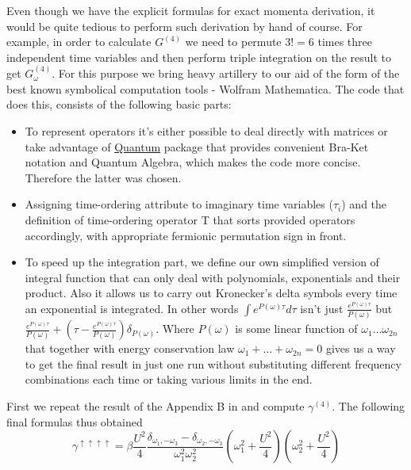 Even though we have the explicit formulas for exact momenta derivation, it would be quite tedious to perform such derivation by hand of course.
For example, in order to calculate $G^{(4)}$ we need to permute $3!=6$ times three independent time variables and then perform
 triple integration on the result to get $G_\omega^{(4)}$.
For this purpose we bring heavy artillery to our aid of the form of the best known symbolical computation tools - Wolfram Mathematica.
The code that does this, consists of the following basic parts:
\begin{itemize}
 \item To represent operators it's either possible to deal directly with matrices or take advantage of \href{http://homepage.cem.itesm.mx/lgomez/quantum/}{Quantum}
package that provides convenient Bra-Ket notation and Quantum Algebra, which makes the code more concise. Therefore the latter was chosen.
 \item Assigning time-ordering attribute to imaginary time variables ($\tau_i$) and the definition of time-ordering operator T that sorts provided operators accordingly,
with appropriate fermionic permutation sign in front.
 \item To speed up the integration part, we define our own simplified version of integral function that can only deal with polynomials, exponentials and their product.
Also it allows us to carry out Kronecker's delta symbols every time an exponential is integrated.
In other words $\int e^{P(\omega)\tau}d\tau$ isn't just $\frac{e^{P(\omega)\tau}}{P(\omega)}$
 but $\frac{e^{P(\omega)\tau}}{P(\omega)}+(\tau-\frac{e^{P(\omega)\tau}}{P(\omega)})\delta_{P(\omega)}$.
Where $P(\omega)$ is some linear function of $\omega_1\dots\omega_{2n}$ that together with energy conservation law $\omega_1+\dots+\omega_{2n}=0$ 
 gives us a way to get the final result in just one run without substituting different frequency combinations each time or taking various limits in the end.
\end{itemize}

First we repeat the result of the Appendix B in \cite{0809.1051} and compute $\gamma^{(4)}$. The following final formulas thus obtained
\begin{equation} \gamma^{\uparrow\uparrow\uparrow\uparrow} = \beta \frac{U^2}{4}\frac{\delta_{\omega_1,-\omega_3}-\delta_{\omega_2,-\omega_3}}{\omega_1^2\omega_2^2}
  (\omega_1^2+\frac{U^2}{4})(\omega_2^2+\frac{U^2}{4}) 
\end{equation}

